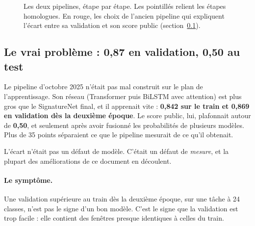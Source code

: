 \begin{figure}[p]
\caption{Les deux pipelines, étape par étape. Les pointillés relient les étapes homologues. En rouge, les choix de l'ancien pipeline qui expliquent l'écart entre sa validation et son score public (section~\ref{sec:diagnostic}).}
\label{fig:avantapres}
\end{figure}

\subsection{Le vrai problème : 0,87 en validation, 0,50 au test}\label{sec:diagnostic}

Le pipeline d'octobre 2025 n'était pas mal construit sur le plan de l'apprentissage. Son réseau (Transformer puis BiLSTM avec attention) est plus gros que le SignatureNet final, et il apprenait vite : \textbf{0,842 sur le train et 0,869 en validation dès la deuxième époque}. Le score public, lui, plafonnait autour de \textbf{0,50}, et seulement après avoir fusionné les probabilités de plusieurs modèles. Plus de 35 points séparaient ce que le pipeline mesurait de ce qu'il obtenait.

L'écart n'était pas un défaut de modèle. C'était un défaut de \emph{mesure}, et la plupart des améliorations de ce document en découlent.

\paragraph{Le symptôme.} Une validation supérieure au train dès la deuxième époque, sur une tâche à 24 classes, n'est pas le signe d'un bon modèle. C'est le signe que la validation est trop facile : elle contient des fenêtres presque identiques à celles du train.

